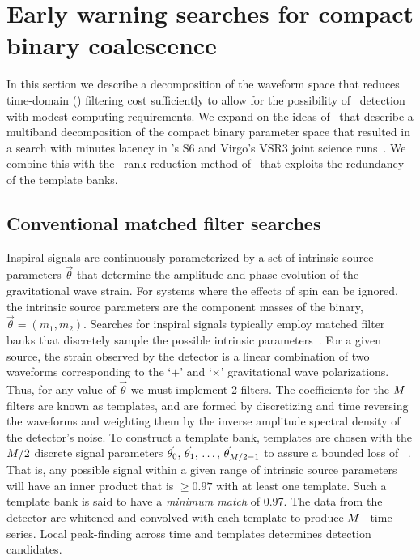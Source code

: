 \section{Early warning searches for compact binary coalescence}
\label{SECII}\label{sec:method}

In this section we describe a decomposition of the \CBC{} waveform space that
reduces time-domain (\TD) filtering cost sufficiently to allow for the
possibility of \earlywarning\ detection with modest computing requirements.  We
expand on the ideas of~\cite{Marion2004, Buskulic2010} that describe a
multiband decomposition of the compact binary parameter space that resulted in
a search with minutes latency in \LIGO{}'s S6 and Virgo's VSR3 joint science
runs~\cite{HugheyGWPAW2011}.  We combine this with the \SVD\ rank-reduction
method of~\cite{Cannon:2010p10398} that exploits the redundancy of
the template banks.

\subsection{Conventional \CBC{} matched filter searches}

Inspiral signals are continuously parameterized by a set of intrinsic source
parameters $\vec\theta$ that determine the amplitude and phase evolution of the
gravitational wave strain. For systems where the effects of spin can be
ignored, the intrinsic source parameters are the component masses of the
binary, $\vec\theta = (m_1, m_2)$. Searches for inspiral signals typically
employ matched filter banks that discretely sample the possible intrinsic
parameters~\cite{findchirppaper}.  For a given source, the strain observed by
the detector is a linear combination of two waveforms corresponding to the
`$+$' and `$\times$' gravitational wave polarizations.  Thus, for any value of
$\vec\theta$ we must implement 2 filters.  The coefficients for the $M$ filters
are known as templates, and are formed by discretizing and time reversing the
waveforms and weighting them by the inverse amplitude spectral density of the
detector's noise. To construct a template bank, templates are chosen with the
$M/2$ discrete signal parameters $\vec\theta_0,\, \vec\theta_1,\, \dots,\,
\vec\theta_{M/2-1}$ to assure a bounded loss of \SNR~\cite{Owen:1998dk}. That
is, any possible signal within a given range of intrinsic
source parameters will have an inner product that is $\geqslant 0.97$ with at
least one template. Such a template bank is said to have a {\em minimum match}
of 0.97. The data from the detector are whitened and convolved with each
template to produce $M$ \SNR\ time series. Local peak-finding across time and
templates determines detection candidates.

